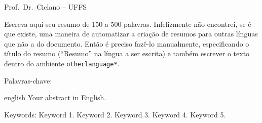 \documentclass[serif, brazilian]{uffstex}
\begin{document}

\pretextual%

\imprimircapa%

\imprimirfolhaderosto*%


                         {Prof.\ Dr.\ Ciclano -- UFFS}

\begin{resumo}
  Escreva aqui seu resumo de 150 a 500 palavras.
  Infelizmente não encontrei, se é que existe, uma maneira de automatizar
  a criação de resumos para outras línguas que não a do documento.
  Então é preciso fazê-lo manualmente, especificando o título do resumo
  (\enquote{Resumo} na língua a ser escrita) e também escrever o texto dentro
  do ambiente \texttt{otherlanguage*}.

  \vspace{\baselineskip}

  Palavras-chave: \imprimirpcs
\end{resumo}

\begin{resumo}[Abstract]
  \begin{otherlanguage*}{english}
    Your abstract in English.

    \vspace{\baselineskip}

    Keywords: Keyword 1. Keyword 2. Keyword 3. Keyword 4. Keyword 5.
  \end{otherlanguage*}
\end{resumo}

\listoffigures*
\cleardoublepage%

\pdfbookmark{\listalgoritmoname}{\algoritmoext}
\listofalgoritmos*
\cleardoublepage%

\listoftables*
\cleardoublepage%
\end{document}
